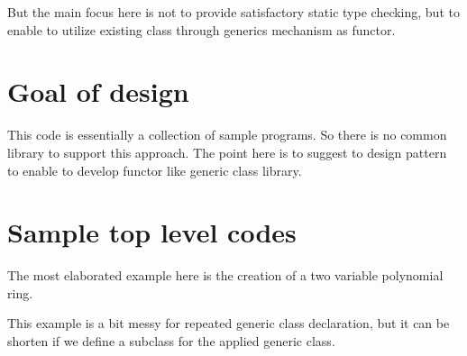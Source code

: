 \documentclass[8pt]{article}
\begin{document}
But the main focus here is not to provide satisfactory static type checking, but to enable to utilize existing class through generics mechanism as functor.

\section{Goal of design}
This code is essentially a collection of sample programs.
So there is no common library to support this approach.
The point here is to suggest to design pattern to enable to develop functor like generic class library.

\section{Sample top level codes}
The most elaborated example here is the creation of a two variable polynomial ring.

This example is a bit messy for repeated generic class declaration, but it can be shorten if we define a subclass for the applied generic class. 
\end{document}

